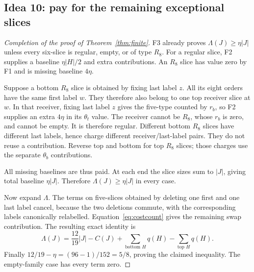 \subsection{Idea 10: pay for the remaining exceptional slices}
\begin{proof}[Completion of the proof of Theorem~\ref{thm:finite}]
F3 already proves \(\Lambda(J)\geq\eta|J|\) unless every six-slice
is regular, empty, or of type \(R_8\). For a regular slice, F2 supplies
a baseline \(\eta|H|/2\) and extra contributions. An \(R_8\) slice
has value zero by F1 and is missing baseline \(4\eta\).

Suppose a bottom \(R_8\) slice is obtained by fixing last label \(z\).
All its eight orders have the same first label \(w\). They therefore
also belong to one top receiver slice at \(w\). In that receiver,
fixing last label \(z\) gives the five-type counted by \(r_b\), so
F2 supplies an extra \(4\eta\) in its \(\theta_t\) value. The receiver
cannot be \(R_8\), whose \(r_b\) is zero, and cannot be empty. It is
therefore regular. Different bottom \(R_8\) slices have different
last labels, hence charge different receiver/last-label pairs. They
do not reuse a contribution. Reverse top and bottom for top \(R_8\)
slices; those charges use the separate \(\theta_b\) contributions.

All missing baselines are thus paid. At each end the slice sizes sum
to \(|J|\), giving total baseline \(\eta|J|\). Therefore
\(\Lambda(J)\geq\eta|J|\) in every case.

Now expand \(\Lambda\). The terms on five-slices obtained by deleting
one first and one last label cancel, because the two deletions
commute, with the corresponding labels canonically relabelled.
Equation~\eqref{eq:costcount} gives the remaining swap contribution.
The resulting exact identity is
\[
 \Lambda(J)=\frac{12}{19}|J|-C(J)+
       \sum_{\text{bottom }H}q(H)-\sum_{\text{top }H}q(H).
\]
Finally \(12/19-\eta=(96-1)/152=5/8\), proving the claimed inequality.
The empty-family case has every term zero.
\end{proof}

